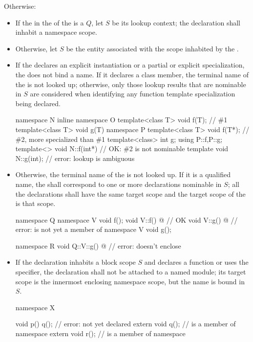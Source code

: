 \pnum
Otherwise:
\begin{itemize}
\item
If the  in
the  of the  is
a  $Q$,
let $S$ be its lookup context;
the declaration shall inhabit a namespace scope.
\item
Otherwise, let $S$ be the entity associated with the scope inhabited by
the .
\item
If the  declares
an explicit instantiation or a partial or explicit specialization,
the  does not bind a name.
If it declares a class member,
the terminal name of the  is not looked up;
otherwise, only those lookup results that are nominable in $S$
are considered when identifying
any function template specialization being declared.
\begin{example}
\begin{codeblock}
namespace N {
  inline namespace O {
    template<class T> void f(T);        // \#1
    template<class T> void g(T) {}
  }
  namespace P {
    template<class T> void f(T*);       // \#2, more specialized than \#1
    template<class> int g;
  }
  using P::f,P::g;
}
template<> void N::f(int*) {}           // OK: \#2 is not nominable
template void N::g(int);                // error: lookup is ambiguous
\end{codeblock}
\end{example}
\item
Otherwise,
the terminal name of the  is not looked up.
If it is a qualified name,
the  shall correspond to
one or more declarations nominable in $S$;
all the declarations shall have the same target scope and
the target scope of the  is that scope.
\begin{example}
\begin{codeblock}
namespace Q {
  namespace V {
    void f();
  }
  void V::f() { @\commentellip@ }     // OK
  void V::g() { @\commentellip@ }     // error:  is not yet a member of 
  namespace V {
    void g();
  }
}

namespace R {
  void Q::V::g() { @\commentellip@ }  // error:  doesn't enclose 
}
\end{codeblock}
\end{example}
\item
If the declaration inhabits a block scope $S$ and
declares a function or uses the  specifier,
the declaration shall not be attached to a named module;
its target scope is the innermost enclosing namespace scope,
but the name is bound in $S$.
\begin{example}
\begin{codeblock}
namespace X {
  void p() {
    q();                        // error:  not yet declared
    extern void q();            //  is a member of namespace 
    extern void r();            //  is a member of namespace 
  }

}
\end{codeblock}
\end{example}
\end{itemize}
